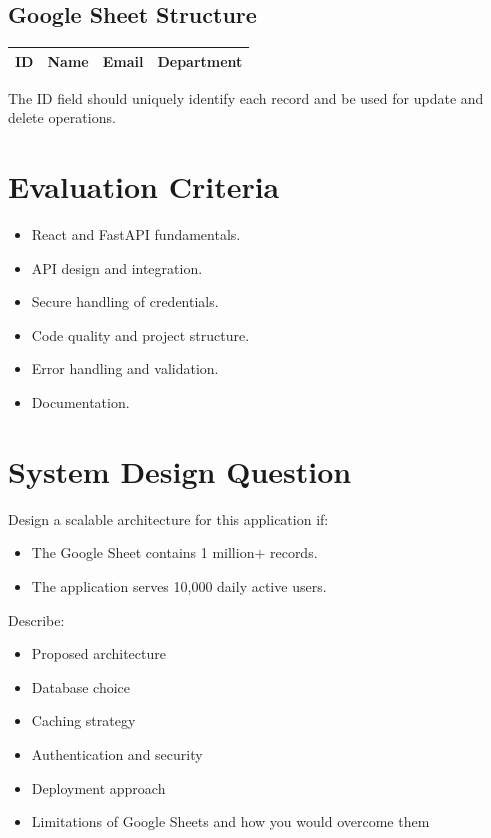 \documentclass[11pt]{article}
\begin{document}
\subsection*{Google Sheet Structure}
\begin{center}
\begin{tabular}{|c|c|c|c|}
\hline
\textbf{ID} & \textbf{Name} & \textbf{Email} & \textbf{Department} \\
\hline
\end{tabular}
\end{center}

The ID field should uniquely identify each record and be used for update and delete operations.

\section*{Evaluation Criteria}
\begin{itemize}[topsep=2pt, itemsep=2pt]
    \item React and FastAPI fundamentals.
    \item API design and integration.
    \item Secure handling of credentials.
    \item Code quality and project structure.
    \item Error handling and validation.
    \item Documentation.
\end{itemize}

\section*{System Design Question}
Design a scalable architecture for this application if:
\begin{itemize}[topsep=2pt, itemsep=2pt]
    \item The Google Sheet contains 1 million+ records.
    \item The application serves 10,000 daily active users.
\end{itemize}

Describe:
\begin{itemize}[topsep=2pt, itemsep=2pt]
    \item Proposed architecture
    \item Database choice
    \item Caching strategy
    \item Authentication and security
    \item Deployment approach
    \item Limitations of Google Sheets and how you would overcome them
\end{itemize}
\end{document}
